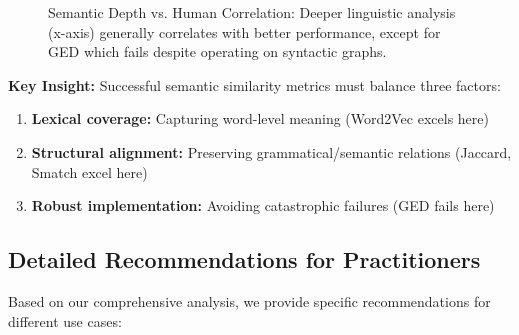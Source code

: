 \documentclass[11pt,a4paper]{article}
\begin{document}
\begin{figure}[h]
\centering
{}
\caption{Semantic Depth vs. Human Correlation: Deeper linguistic analysis (x-axis) generally correlates with better performance, except for GED which fails despite operating on syntactic graphs.}
\end{figure}

\textbf{Key Insight:} Successful semantic similarity metrics must balance three factors:
\begin{enumerate}
    \item \textbf{Lexical coverage:} Capturing word-level meaning (Word2Vec excels here)
    \item \textbf{Structural alignment:} Preserving grammatical/semantic relations (Jaccard, Smatch excel here)
    \item \textbf{Robust implementation:} Avoiding catastrophic failures (GED fails here)
\end{enumerate}

\subsection{Detailed Recommendations for Practitioners}

Based on our comprehensive analysis, we provide specific recommendations for different use cases:
\end{document}

